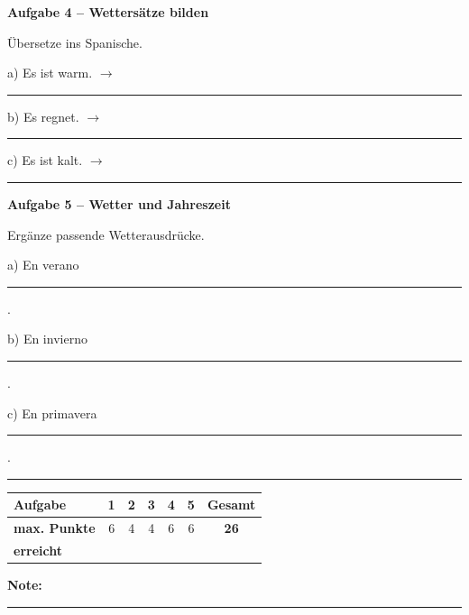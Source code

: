 \documentclass[11pt, a4paper]{article}
\newcommand{\fachfarbe}{spanisch}
\newcommand{\punktebox}[1]{\hfill\fbox{\small \_/#1}}
\newcommand{\luecke}[1]{\rule{#1}{0.4pt}}
\newenvironment{aufgabe}[1]{%
    \needspace{5\baselineskip}%
    \nopagebreak[4]%
    \vspace{10pt}
    \noindent\textbf{\textcolor{\fachfarbe}{Aufgabe #1}}
    \nopagebreak[4]%
    \vspace{5pt}
    \nopagebreak[4]%
    \begin{list}{}{\leftmargin=0pt}
    \item[]
}{%
    \end{list}
}
\begin{document}
\begin{aufgabe}{4 -- Wettersätze bilden}
Übersetze ins Spanische. \punktebox{6}
\end{aufgabe}

\noindent
a) Es ist warm. $\rightarrow$ \luecke{6cm}

\vspace{0.8em}

\noindent
b) Es regnet. $\rightarrow$ \luecke{6cm}

\vspace{0.8em}

\noindent
c) Es ist kalt. $\rightarrow$ \luecke{6cm}

\vspace{15pt}


\begin{aufgabe}{5 -- Wetter und Jahreszeit}
Ergänze passende Wetterausdrücke. \punktebox{6}
\end{aufgabe}

\noindent
a) En verano \luecke{6cm}.

\vspace{0.8em}

\noindent
b) En invierno \luecke{6cm}.

\vspace{0.8em}

\noindent
c) En primavera \luecke{6cm}.


\vspace{25pt}
\hrule
\vspace{10pt}

\noindent
\begin{tabularx}{\textwidth}{|X|c|c|c|c|c||c|}
\hline
\textbf{Aufgabe} & 1 & 2 & 3 & 4 & 5 & \textbf{Gesamt} \\
\hline
\textbf{max. Punkte} & 6 & 4 & 4 & 6 & 6 & \textbf{26} \\
\hline
\textbf{erreicht} & & & & & & \\[0.8em]
\hline
\end{tabularx}

\vspace{10pt}

\begin{flushright}
\textbf{Note:} \luecke{2cm}
\end{flushright}
\end{document}
